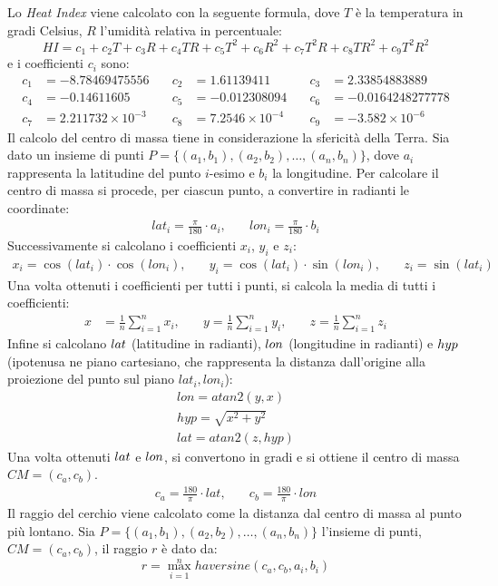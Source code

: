 Lo \textit{Heat Index} viene calcolato con la seguente formula, dove $T$ è la temperatura in gradi Celsius, $R$ l'umidità relativa in percentuale:
\[
	HI = c_1 + c_2 T + c_3 R + c_4 TR + c_5 T^2 + c_6 R^2 + c_7 T^2 R + c_8 TR^2 + c_9 T^2 R^2
\]
e i coefficienti $c_i$ sono:
\[
	\begin{aligned}
		c_1 & = -8.78469475556          & \quad c_2 & = 1.61139411            & \quad c_3 & = 2.33854883889         \\
		c_4 & = -0.14611605             & \quad c_5 & = -0.012308094          & \quad c_6 & = -0.0164248277778      \\
		c_7 & = 2.211732 \times 10^{-3} & \quad c_8 & = 7.2546 \times 10^{-4} & \quad c_9 & = -3.582 \times 10^{-6}
	\end{aligned}
\]
Il calcolo del centro di massa tiene in considerazione la sfericità della Terra. Sia dato un insieme di punti $P = \{(a_1, b_1), (a_2, b_2), \ldots, (a_n, b_n)\}$, dove $a_i$ rappresenta
la latitudine del punto $i$-esimo e $b_i$ la longitudine. Per calcolare il centro di massa si procede, per ciascun punto, a convertire in radianti le coordinate:
\[
	\begin{align*}
		lat_i = \frac{\pi}{180} \cdot a_i, & \quad lon_i = \frac{\pi}{180} \cdot b_i
	\end{align*}
\]
Successivamente si calcolano i coefficienti $x_i$, $y_i$ e $z_i$:
\[
	\begin{align*}
		x_i = \cos(lat_i) \cdot \cos(lon_i),       &
		\quad y_i = \cos(lat_i) \cdot \sin(lon_i), &
		\quad z_i = \sin(lat_i)
	\end{align*}
\]
Una volta ottenuti i coefficienti per tutti i punti, si calcola la media di tutti i coefficienti:
\[
	\begin{aligned}
		x & = \frac{1}{n} \sum_{i=1}^{n} x_i, & \quad y = \frac{1}{n} \sum_{i=1}^{n} y_i, & \quad z = \frac{1}{n} \sum_{i=1}^{n} z_i
	\end{aligned}
\]
Infine si calcolano ${lat}$ (latitudine in radianti), ${lon}$ (longitudine in radianti) e ${hyp}$ (ipotenusa ne piano cartesiano, che rappresenta la distanza dall'origine alla proiezione del punto sul piano $lat_i, lon_i$):
\begin{align*}
	lon = atan2(y, x)      \\
	hyp = \sqrt{x^2 + y^2} \\
	lat = atan2(z, hyp)
\end{align*}
Una volta ottenuti ${lat}$ e ${lon}$, si convertono in gradi e si ottiene il centro di massa $CM = (c_a, c_b)$.
\[
	\begin{align*}
		c_a = \frac{180}{\pi} \cdot lat, & \quad c_b = \frac{180}{\pi} \cdot lon
	\end{align*}
\]
Il raggio del cerchio viene calcolato come la distanza dal centro di massa al punto più lontano. Sia $P = \{(a_1, b_1), (a_2, b_2), \ldots, (a_n, b_n)\}$ l'insieme di punti, $CM = (c_a, c_b)$, il
raggio $r$ è dato da:
\[
	r = \max_{i=1}^{n} haversine(c_a, c_b, a_i, b_i)
\]


